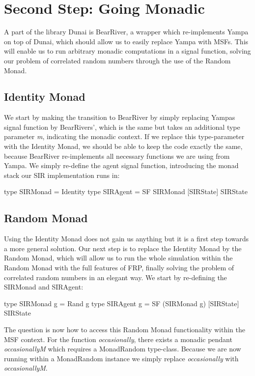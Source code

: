 \section{Second Step: Going Monadic}
A part of the library Dunai is BearRiver, a wrapper which re-implements Yampa on top of Dunai, which should allow us to easily replace Yampa with MSFs. This will enable us to run arbitrary monadic computations in a signal function, solving our problem of correlated random numbers through the use of the Random Monad.

\subsection{Identity Monad}
We start by making the transition to BearRiver by simply replacing Yampas signal function by BearRivers', which is the same but takes an additional type parameter \textit{m}, indicating the monadic context. If we replace this type-parameter with the Identity Monad, we should be able to keep the code exactly the same, because BearRiver re-implements all necessary functions we are using from Yampa. We simply re-define the agent signal function, introducing the monad stack our SIR implementation runs in:

\begin{HaskellCode}
type SIRMonad = Identity
type SIRAgent = SF SIRMonad [SIRState] SIRState
\end{HaskellCode}

\subsection{Random Monad}
Using the Identity Monad does not gain us anything but it is a first step towards a more general solution. Our next step is to replace the Identity Monad by the Random Monad, which will allow us to run the whole simulation within the Random Monad with the full features of FRP, finally solving the problem of correlated random numbers in an elegant way. We start by re-defining the SIRMonad and SIRAgent:

\begin{HaskellCode}
type SIRMonad g = Rand g
type SIRAgent g = SF (SIRMonad g) [SIRState] SIRState
\end{HaskellCode}

The question is now how to access this Random Monad functionality within the MSF context. For the function \textit{occasionally}, there exists a monadic pendant \textit{occasionallyM} which requires a MonadRandom type-class. Because we are now running within a MonadRandom instance we simply replace \textit{occasionally} with \textit{occasionallyM}. 

